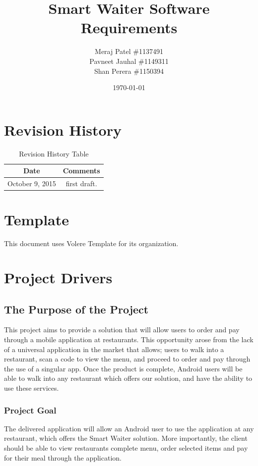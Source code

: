 \documentclass[12pt, titlepage]{article}
\begin{document}
\title{Smart Waiter Software Requirements} 
\author{Meraj Patel \#1137491 \\ Pavneet Jauhal \#1149311\\ Shan Perera \#1150394}
\date{\today}
\maketitle

\tableofcontents 

\listoffigures

\listoftables

\begin{table}[H]
\section*{Revision History}
\begin{tabular}{|c|c|}
\hline
\textbf{Date}  & \textbf{Comments} \\ \hline
October 9, 2015 &  first draft. \\ 
\hline
\end{tabular}
\caption{Revision History Table}
\end{table}

\section*{Template}
This document uses Volere Template for its organization.
\pagebreak

\section{Project Drivers}

\subsection{The Purpose of the Project}
This project aims to provide a solution that will allow users to order and pay through a mobile application at restaurants. This opportunity arose from the lack of a universal application in the market that allows; users to walk into a restaurant, scan a code to view the menu, and proceed to order and pay through the use of a singular app. Once the product is complete, Android users will be able to walk into any restaurant which offers our solution, and have the ability to use these services.
\subsubsection{Project Goal}
The delivered application will allow an Android user to use the application at any restaurant, which offers the Smart Waiter solution.  More importantly, the client should be able to view restaurants complete menu, order selected items and pay for their meal through the application. 
\end{document}
